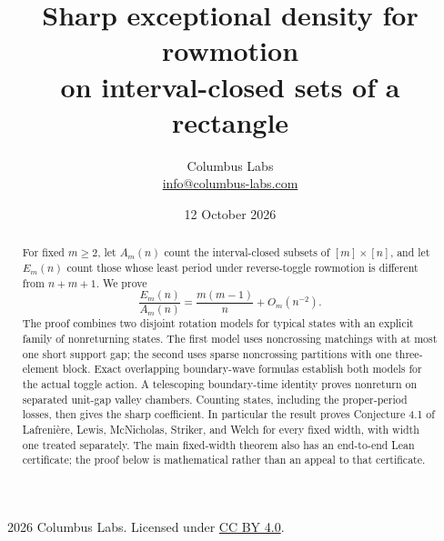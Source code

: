 \documentclass[11pt]{article}
\title{Sharp exceptional density for rowmotion\protect\\on interval-closed sets of a rectangle}
\author{Columbus Labs\\\small\href{mailto:info@columbus-labs.com}{info@columbus-labs.com}}
\date{12 October 2026}
\theoremstyle{definition}\newtheorem{definition}[theorem]{Definition}
\theoremstyle{remark}\newtheorem{remark}[theorem]{Remark}
\begin{document}
\maketitle
\begin{abstract}
For fixed $m\ge2$, let $A_m(n)$ count the interval-closed subsets of $[m]\times[n]$, and let $E_m(n)$ count those whose least period under reverse-toggle rowmotion is different from $n+m+1$. We prove
\[
\frac{E_m(n)}{A_m(n)}=\frac{m(m-1)}n+O_m(n^{-2}).
\]
The proof combines two disjoint rotation models for typical states with an explicit family of nonreturning states. The first model uses noncrossing matchings with at most one short support gap; the second uses sparse noncrossing partitions with one three-element block. Exact overlapping boundary-wave formulas establish both models for the actual toggle action. A telescoping boundary-time identity proves nonreturn on separated unit-gap valley chambers. Counting states, including the proper-period losses, then gives the sharp coefficient. In particular the result proves Conjecture 4.1 of Lafreni\`ere, Lewis, McNicholas, Striker, and Welch for every fixed width, with width one treated separately. The main fixed-width theorem also has an end-to-end Lean certificate; the proof below is mathematical rather than an appeal to that certificate.
\end{abstract}
\vspace{3pt}
\noindent\small\textcopyright\ 2026 Columbus Labs. Licensed under \href{https://creativecommons.org/licenses/by/4.0/}{CC BY 4.0}.\normalsize
\tableofcontents







\appendix




\end{document}
